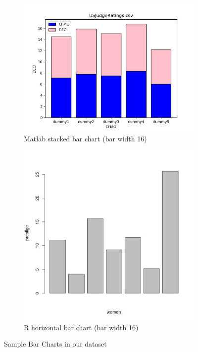 \documentclass[12pt, a4paper,oneside]{report}
\begin{document}
\begin{figure}[!htbp]
	\begin{subfigure}{.5\textwidth}
		\centering
		\includegraphics[width=.8\linewidth]{bar1}
		\caption{Matlab stacked bar chart (bar width 16) }
		\label{fig:bar1}
	\end{subfigure}%
	\begin{subfigure}{.5\textwidth}
		\centering
		\includegraphics[width=.8\linewidth]{bar2}
		\caption{R horizontal bar chart (bar width 16)}
		\label{fig:bar2}
	\end{subfigure}
	\caption{Sample Bar Charts in our dataset}
	\label{fig:bars}
\end{figure}
\end{document}
